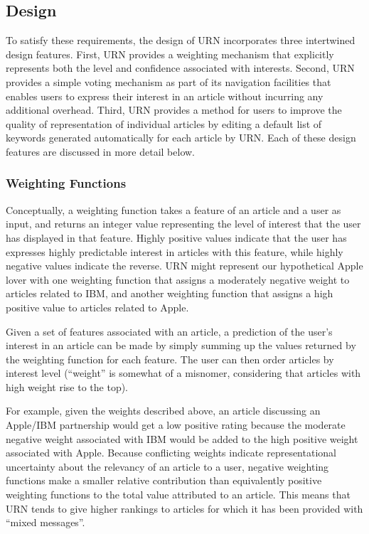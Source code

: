 \subsection{Design}

To satisfy these requirements, the design of URN incorporates three
intertwined design features.  First, URN provides a weighting mechanism
that explicitly represents both the level and confidence associated with
interests.  Second, URN provides a simple voting mechanism as part of its
navigation facilities that enables users to express their interest in an
article without incurring any additional overhead.  Third, URN provides a
method for users to improve the quality of representation of individual
articles by editing a default list of keywords generated automatically for
each article by URN.  Each of these design features are discussed in more
detail below.

\subsubsection{Weighting Functions}

Conceptually, a weighting function takes a feature of an article and a user
as input, and returns an integer value representing the level of interest
that the user has displayed in that feature.  Highly positive values
indicate that the user has expresses highly predictable interest in
articles with this feature, while highly negative values indicate the
reverse.  URN might represent our hypothetical Apple lover with one
weighting function that assigns a moderately negative weight to articles
related to IBM, and another weighting function that assigns a high positive
value to articles related to Apple.

Given a set of features associated with an article, a prediction of
the user's interest in an article can be made by simply summing up the
values returned by the weighting function for each feature.  The user can
then order articles by interest level (``weight'' is somewhat of a
misnomer, considering that articles with high weight rise to the top).

For example, given the weights described above, an article discussing an
Apple/IBM partnership would get a low positive rating because the moderate
negative weight associated with IBM would be added to the high positive
weight associated with Apple. Because conflicting weights indicate
representational uncertainty about the relevancy of an article to a user,
negative weighting functions make a smaller relative contribution than
equivalently positive weighting functions to the total value attributed to
an article. This means that URN tends to give higher rankings to articles
for which it has been provided with ``mixed messages''.

